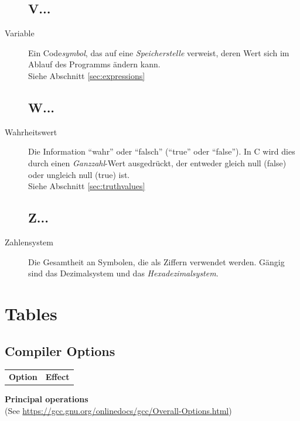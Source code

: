 \begin{appendices}
\begin{description}
\section*{V...}
\item[Variable] Ein Code\emph{symbol}, das auf eine \emph{Speicherstelle} verweist, deren Wert sich
	im Ablauf des Programms ändern kann.\\
	Siehe Abschnitt \ref{sec:expressions}

\section*{W...}
\item[Wahrheitswert] Die Information \enquote{wahr} oder \enquote{falsch} (\enquote{true} oder
	\enquote{false}). In C wird dies durch einen \emph{Ganzzahl}-Wert ausgedrückt, der entweder gleich
	null (false) oder ungleich null (true) ist.\\
	Siehe Abschnitt \ref{sec:truthvalues}

\section*{Z...}
\item[Zahlensystem] Die Gesamtheit an Symbolen, die als Ziffern verwendet werden. Gängig sind das
	Dezimalsystem und das \emph{Hexadezimalsystem}.
\end{description}



\chapter{Tables}
\section{Compiler Options}
{

\begin{tabularx}
	{\linewidth}
	{OE}
	\toprule[1.5pt]

	\normalfont	\bfseries Option &
				\bfseries Effect
	\tabcrlf
\end{tabularx}

\vspace{6pt}
\textbf{Principal operations} \\
(See \url{https://gcc.gnu.org/onlinedocs/gcc/Overall-Options.html})

}
\end{appendices}
